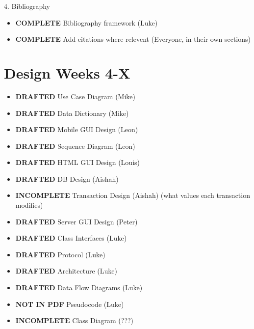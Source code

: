 4. Bibliography
\begin{itemize}
\item \textbf{COMPLETE} Bibliography framework (Luke)
\item \textbf{COMPLETE} Add citations where relevent (Everyone, in their own sections)
\end{itemize}

\section{Design \textbf{Weeks 4-X}}
\begin{itemize}
\item \textbf{DRAFTED}    Use Case Diagram (Mike)
\item \textbf{DRAFTED}    Data Dictionary (Mike)
\item \textbf{DRAFTED}    Mobile GUI Design (Leon)
\item \textbf{DRAFTED}    Sequence Diagram (Leon)
\item \textbf{DRAFTED}    HTML GUI Design (Louis)
\item \textbf{DRAFTED}    DB Design (Aishah)
\item \textbf{INCOMPLETE}    Transaction Design (Aishah) (what values each transaction modifies)
\item \textbf{DRAFTED}    Server GUI Design (Peter)
\item \textbf{DRAFTED}    Class Interfaces (Luke)
\item \textbf{DRAFTED}    Protocol (Luke)
\item \textbf{DRAFTED}    Architecture (Luke)
\item \textbf{DRAFTED}    Data Flow Diagrams (Luke)
\item \textbf{NOT IN PDF}    Pseudocode (Luke)
\item \textbf{INCOMPLETE}    Class Diagram (???)
\end{itemize}
